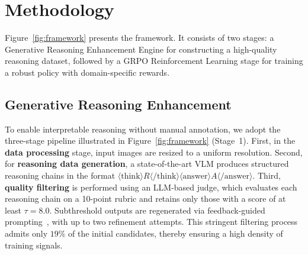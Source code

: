 \documentclass[sigconf,anonymous,review]{acmart}
\begin{document}
\section{Methodology}
\label{sec:methodology}

Figure~\ref{fig:framework} presents the framework. It consists of two stages: a Generative Reasoning Enhancement Engine for constructing a high-quality reasoning dataset, followed by a GRPO Reinforcement Learning stage for training a robust policy with domain-specific rewards.


\subsection{Generative Reasoning Enhancement}
\label{sec:cot_augmentation}

To enable interpretable reasoning without manual annotation, we adopt the three-stage pipeline illustrated in Figure~\ref{fig:framework} (Stage~1).
First, in the \textbf{data processing} stage, input images are resized to a uniform resolution.
Second, for \textbf{reasoning data generation}, a state-of-the-art VLM produces structured reasoning chains in the format
$\langle\text{think}\rangle R \langle/\text{think}\rangle \langle\text{answer}\rangle A \langle/\text{answer}\rangle$.
Third, \textbf{quality filtering} is performed using an LLM-based judge, which evaluates each reasoning chain on a 10-point rubric and retains only those with a score of at least $\tau = 8.0$.
Subthreshold outputs are regenerated via feedback-guided prompting~\cite{stan2025learning}, with up to two refinement attempts.
This stringent filtering process admits only $19\%$ of the initial candidates, thereby ensuring a high density of training signals.
\end{document}
